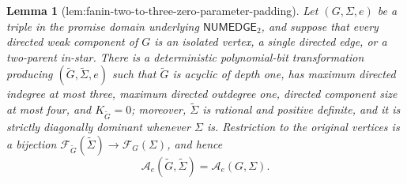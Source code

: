 \documentclass{article}
\newtheorem{lemma}{Lemma}
\begin{document}
\begin{lemma}[lem:fanin-two-to-three-zero-parameter-padding]\label{lem:fanin-two-to-three-zero-parameter-padding}
Let \((G,\Sigma,e)\) be a triple in the promise domain underlying \(\mathsf{NUMEDGE}_2\), and suppose that every directed weak component of \(G\) is an isolated vertex, a single directed edge, or a two-parent in-star. There is a deterministic polynomial-bit transformation producing \((\widetilde G,\widetilde\Sigma,e)\) such that \(\widetilde G\) is acyclic of depth one, has maximum directed indegree at most three, maximum directed outdegree one, directed component size at most four, and \(K_{\widetilde G}=0\); moreover, \(\widetilde\Sigma\) is rational and positive definite, and it is strictly diagonally dominant whenever \(\Sigma\) is. Restriction to the original vertices is a bijection \(\mathcal F_{\widetilde G}(\widetilde\Sigma)\to\mathcal F_G(\Sigma)\), and hence
\[
\mathcal A_e(\widetilde G,\widetilde\Sigma)=\mathcal A_e(G,\Sigma).
\]
\end{lemma}
\end{document}
